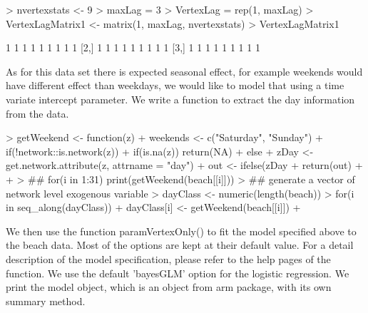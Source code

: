 \documentclass[12pt]{article}
\begin{document}
\begin{Schunk}
\begin{Sinput}
> nvertexstats <- 9
> maxLag = 3
> VertexLag = rep(1, maxLag)
> VertexLagMatrix1 <- matrix(1, maxLag, nvertexstats)
> VertexLagMatrix1
\end{Sinput}
\begin{Soutput}
     [,1] [,2] [,3] [,4] [,5] [,6] [,7] [,8] [,9]
[1,]    1    1    1    1    1    1    1    1    1
[2,]    1    1    1    1    1    1    1    1    1
[3,]    1    1    1    1    1    1    1    1    1
\end{Soutput}
\end{Schunk}

As for this data set there is expected seasonal effect, for example weekends would have different effect than weekdays, we would like to model that using a time variate intercept parameter. We write a function to extract the day information from the data.

\begin{Schunk}
\begin{Sinput}
> getWeekend <- function(z){
+     weekends <- c("Saturday", "Sunday")
+     if(!network::is.network(z)){
+         if(is.na(z)) return(NA)
+     } else {
+          zDay <- get.network.attribute(z, attrname = "day")
+          out <- ifelse(zDay %in% weekends, 1, 0)
+          return(out)   
+     }
+ }
> ## for(i in 1:31) print(getWeekend(beach[[i]]))
> ## generate a vector of network level exogenous variable
> dayClass <- numeric(length(beach))
> for(i in seq_along(dayClass)) {
+     dayClass[i] <- getWeekend(beach[[i]])
+ }
\end{Sinput}
\end{Schunk}

We then use the function paramVertexOnly() to fit the model specified above to the beach data. Most of the options are kept at their default value. For a detail description of the model specification, please refer to the help pages of the function. We use the default 'bayesGLM' option for the logistic regression. We print the model object, which is an object from arm package, with its own summary method.
\end{document}
